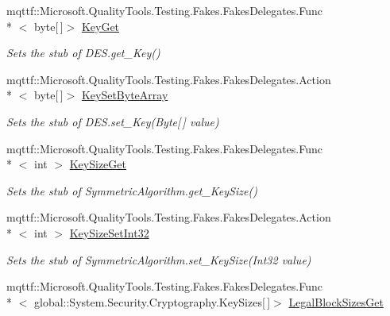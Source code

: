 \begin{DoxyCompactItemize}
mqttf\-::\-Microsoft.\-Quality\-Tools.\-Testing.\-Fakes.\-Fakes\-Delegates.\-Func\\*
$<$ byte\mbox{[}$\,$\mbox{]}$>$ \hyperlink{class_system_1_1_security_1_1_cryptography_1_1_fakes_1_1_stub_d_e_s_a3c29414de56f0dd4696d729522cb88bf}{Key\-Get}
\begin{DoxyCompactList}\small\item\em Sets the stub of D\-E\-S.\-get\-\_\-\-Key()\end{DoxyCompactList}\item 
mqttf\-::\-Microsoft.\-Quality\-Tools.\-Testing.\-Fakes.\-Fakes\-Delegates.\-Action\\*
$<$ byte\mbox{[}$\,$\mbox{]}$>$ \hyperlink{class_system_1_1_security_1_1_cryptography_1_1_fakes_1_1_stub_d_e_s_a9c583efa780bea2695f0ea1b11b8b038}{Key\-Set\-Byte\-Array}
\begin{DoxyCompactList}\small\item\em Sets the stub of D\-E\-S.\-set\-\_\-\-Key(\-Byte\mbox{[}$\,$\mbox{]} value)\end{DoxyCompactList}\item 
mqttf\-::\-Microsoft.\-Quality\-Tools.\-Testing.\-Fakes.\-Fakes\-Delegates.\-Func\\*
$<$ int $>$ \hyperlink{class_system_1_1_security_1_1_cryptography_1_1_fakes_1_1_stub_d_e_s_a29107464ffe41db45f4de2e89b835184}{Key\-Size\-Get}
\begin{DoxyCompactList}\small\item\em Sets the stub of Symmetric\-Algorithm.\-get\-\_\-\-Key\-Size()\end{DoxyCompactList}\item 
mqttf\-::\-Microsoft.\-Quality\-Tools.\-Testing.\-Fakes.\-Fakes\-Delegates.\-Action\\*
$<$ int $>$ \hyperlink{class_system_1_1_security_1_1_cryptography_1_1_fakes_1_1_stub_d_e_s_a53e8298cba8c6bef71801a2cd62a4019}{Key\-Size\-Set\-Int32}
\begin{DoxyCompactList}\small\item\em Sets the stub of Symmetric\-Algorithm.\-set\-\_\-\-Key\-Size(\-Int32 value)\end{DoxyCompactList}\item 
mqttf\-::\-Microsoft.\-Quality\-Tools.\-Testing.\-Fakes.\-Fakes\-Delegates.\-Func\\*
$<$ global\-::\-System.\-Security.\-Cryptography.\-Key\-Sizes\mbox{[}$\,$\mbox{]}$>$ \hyperlink{class_system_1_1_security_1_1_cryptography_1_1_fakes_1_1_stub_d_e_s_a5b585be0f93296275d8d7f36224b00bd}{Legal\-Block\-Sizes\-Get}

\end{DoxyCompactItemize}
